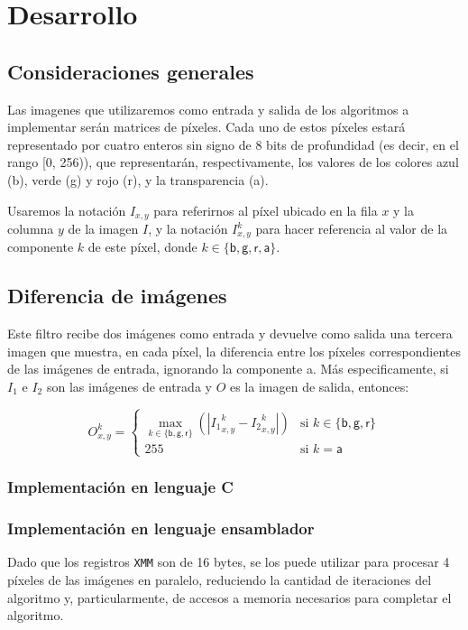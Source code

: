 \section{Desarrollo}

  \subsection{Consideraciones generales}
    Las imagenes que utilizaremos como entrada y salida de los algoritmos a implementar serán matrices de píxeles. Cada uno de estos píxeles estará representado por cuatro enteros sin signo de 8 bits de profundidad (es decir, en el rango [0, 256)), que representarán, respectivamente, los valores de los colores azul (\textsf{b}), verde (\textsf{g}) y rojo (\textsf{r}), y la transparencia (\textsf{a}).

    Usaremos la notación $I_{x,y}$ para referirnos al píxel ubicado en la fila $x$ y la columna $y$ de la imagen $I$, y la notación $I_{x,y}^k$ para hacer referencia al valor de la componente $k$ de este píxel, donde $k \in \lbrace \mathsf{b, g, r, a} \rbrace$.
  
  \subsection{Diferencia de imágenes}
    Este filtro recibe dos imágenes como entrada y devuelve como salida una tercera imagen que muestra, en cada píxel, la diferencia entre los píxeles correspondientes de las imágenes de entrada, ignorando la componente \textsf{a}. Más especificamente, si $I_1$ e $I_2$ son las imágenes de entrada y $O$ es la imagen de salida, entonces:

    \[ O_{x,y}^k = \begin{cases}
      \displaystyle \max_{k \in \lbrace \mathsf{b, g, r} \rbrace} \left( \left\vert {I_1}_{x,y}^k - {I_2}_{x,y}^k \right\vert \right)
        & \text{si } k \in \lbrace \mathsf{b, g, r} \rbrace \\
      255
        & \text{si } k = \mathsf{a}
    \end{cases} \]

    \subsubsection{Implementación en lenguaje C}

    \subsubsection{Implementación en lenguaje ensamblador}
      Dado que los registros \texttt{XMM} son de 16 bytes, se los puede utilizar para procesar 4 píxeles de las imágenes en paralelo, reduciendo la cantidad de iteraciones del algoritmo y, particularmente, de accesos a memoria necesarios para completar el algoritmo.


